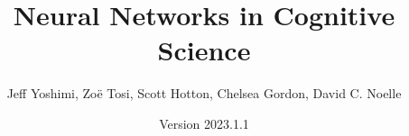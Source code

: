 \documentclass[oneside]{book}
\begin{document}
\title{Neural Networks in Cognitive Science}
\author{Jeff Yoshimi, Zo\"e Tosi, Scott Hotton, Chelsea Gordon, David C. Noelle}
\date{Version 2023.1.1}  %
\maketitle

\tableofcontents




















\appendix


{} 
\listoffigures

{} 
{}

\end{document}
